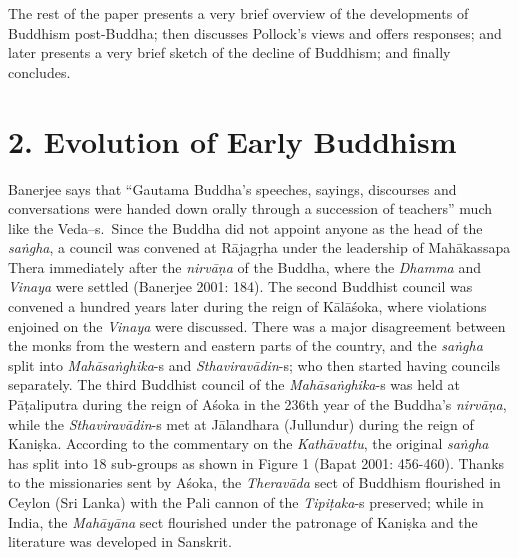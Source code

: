 The rest of the paper presents a very brief overview of the developments of Buddhism post-Buddha; then discusses Pollock’s views and offers responses; and later presents a very brief sketch of the decline of Buddhism; and finally concludes.


\section*{2. Evolution of Early Buddhism}

Banerjee says that “Gautama Buddha’s speeches, sayings, discourses and conversations were handed down orally through a succession of teachers” much like the Veda--s.~Since the Buddha did not appoint anyone as the head of the \textit{saṅgha}, a council was convened at Rājagṛha under the leadership of Mahākassapa Thera immediately after the \textit{nirvāṇa} of the Buddha, where the \textit{Dhamma} and \textit{Vinaya} were settled (Banerjee 2001: 184). The second Buddhist council was convened a hundred years later during the reign of Kālāśoka, where violations enjoined on the \textit{Vinaya} were discussed. There was a major disagreement between the monks from the western and eastern parts of the country, and the \textit{saṅgha} split into \textit{Mahāsaṅghika}-s and \textit{Sthaviravādin}-s; who then started having councils separately. The third Buddhist council of the \textit{Mahāsaṅghika}-s was held at Pāṭaliputra during the reign of Aśoka in the 236th year of the Buddha’s \textit{nirvāṇa}, while the \textit{Sthaviravādin}-s met at Jālandhara (Jullundur) during the reign of Kaniṣka. According to the commentary on the \textit{Kathāvattu}, the original \textit{saṅgha} has split into 18 sub-groups as shown in Figure 1 (Bapat 2001: 456-460). Thanks to the missionaries sent by Aśoka, the \textit{Theravāda} sect of Buddhism flourished in Ceylon (Sri Lanka) with the Pali cannon of the \textit{Tipiṭaka}-s preserved; while in India, the \textit{Mahāyāna} sect flourished under the patronage of Kaniṣka and the literature was developed in Sanskrit.

